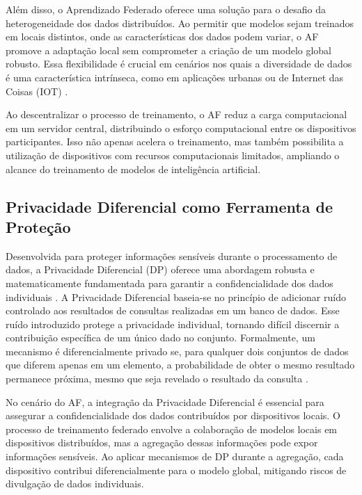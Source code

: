 Além disso, o Aprendizado Federado oferece uma solução para o desafio da heterogeneidade dos dados distribuídos. Ao permitir que modelos sejam treinados em locais distintos, onde as características dos dados podem variar, o AF promove a adaptação local sem comprometer a criação de um modelo global robusto. Essa flexibilidade é crucial em cenários nos quais a diversidade de dados é uma característica intrínseca, como em aplicações urbanas ou de Internet das Coisas (IOT) \cite{yang2019federated}.

Ao descentralizar o processo de treinamento, o AF reduz a carga computacional em um servidor central, distribuindo o esforço computacional entre os dispositivos participantes. Isso não apenas acelera o treinamento, mas também possibilita a utilização de dispositivos com recursos computacionais limitados, ampliando o alcance do treinamento de modelos de inteligência artificial\cite{bonawitz2019towards}.

\subsection{Privacidade Diferencial como Ferramenta de Proteção}

Desenvolvida para proteger informações sensíveis durante o processamento de dados, a Privacidade Diferencial (DP) oferece uma abordagem robusta e matematicamente fundamentada para garantir a confidencialidade dos dados individuais \cite{dwork2011}. A Privacidade Diferencial baseia-se no princípio de adicionar ruído controlado aos resultados de consultas realizadas em um banco de dados. Esse ruído introduzido protege a privacidade individual, tornando difícil discernir a contribuição específica de um único dado no conjunto. Formalmente, um mecanismo é diferencialmente privado se, para qualquer dois conjuntos de dados que diferem apenas em um elemento, a probabilidade de obter o mesmo resultado permanece próxima, mesmo que seja revelado o resultado da consulta \cite{dwork2011}.

No cenário do AF, a integração da Privacidade Diferencial é essencial para assegurar a confidencialidade dos dados contribuídos por dispositivos locais. O processo de treinamento federado envolve a colaboração de modelos locais em dispositivos distribuídos, mas a agregação dessas informações pode expor informações sensíveis. Ao aplicar mecanismos de DP durante a agregação, cada dispositivo contribui diferencialmente para o modelo global, mitigando riscos de divulgação de dados individuais\cite{abadi2016}.

